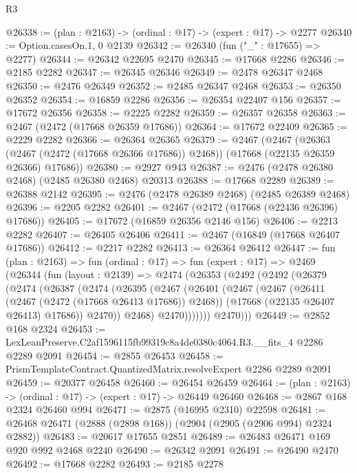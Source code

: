 \begin{lexlean}{R3}
\begin{coremodule}
@26338 := (plan : @2163) -> (ordinal : @17) -> (expert : @17) -> @2277
@26340 := Option.casesOn.{1, 0} @2139
@26342 := @26340 (fun ("_" : @17655) => @2277)
@26344 := @26342 @22695 @2470
@26345 := @17668 @2286
@26346 := @2185 @2282
@26347 := @26345 @26346
@26349 := @2478 @26347 @2468
@26350 := @2476 @26349
@26352 := @2485 @26347 @2468
@26353 := @26350 @26352
@26354 := @16859 @2286
@26356 := @26354 @22407 @156
@26357 := @17672 @26356
@26358 := @2225 @2282
@26359 := @26357 @26358
@26363 := @2467 (@2472 (@17668 @26359 @17686))
@26364 := @17672 @22409
@26365 := @2229 @2282
@26366 := @26364 @26365
@26379 := @2467
    (@2467
      (@26363 (@2467 (@2472 (@17668 @26366 @17686)) @2468))
      (@17668 (@22135 @26359 @26366) @17686))
@26380 := @2927 @943
@26387 := @2476 (@2478 @26380 @2468) (@2485 @26380 @2468) @20313
@26388 := @17668 @2289
@26389 := @26388 @2142
@26395 := @2476 (@2478 @26389 @2468) (@2485 @26389 @2468)
@26396 := @2205 @2282
@26401 := @2467 (@2472 (@17668 (@22436 @26396) @17686))
@26405 := @17672 (@16859 @26356 @2146 @156)
@26406 := @2213 @2282
@26407 := @26405 @26406
@26411 := @2467 (@16849 (@17668 @26407 @17686))
@26412 := @2217 @2282
@26413 := @26364 @26412
@26447 := fun (plan : @2163) =>
  fun (ordinal : @17) =>
  fun (expert : @17) =>
  @2469
    (@26344
      (fun (layout : @2139) =>
      @2474
        (@26353
          (@2492
            (@2492
              (@26379
                (@2474
                  (@26387
                    (@2474
                      (@26395
                        (@2467
                          (@26401
                            (@2467
                              (@2467
                                (@26411 (@2467 (@2472 (@17668 @26413 @17686)) @2468))
                                (@17668 (@22135 @26407 @26413) @17686))
                              @2470))
                          @2468)
                        @2470)))))))
          @2470)))
@26449 := @2852 @168 @2324
@26453 := LexLeanPreserve.C2af1596115fb99319c8a4de0380c4064.R3.__fits_4 @2286 @2289 @2091
@26454 := @2855 @26453
@26458 := PrismTemplateContract.QuantizedMatrix.resolveExpert @2286 @2289 @2091
@26459 := @20377 @26458
@26460 := @26454 @26459
@26464 := (plan : @2163) -> (ordinal : @17) -> (expert : @17) -> @26449 @26460
@26468 := @2867 @168 @2324 @26460 @994
@26471 := @2875 (@16995 @2310) @22598
@26481 := @26468 @26471 (@2888 (@2898 @168)) (@2904 (@2905 (@2906 @994) @2324 @2882))
@26483 := @20617 @17655 @2851
@26489 := @26483 @26471 @169 @920 @992 @2468 @2240
@26490 := @26342 @2091
@26491 := @26490 @2470
@26492 := @17668 @2282
@26493 := @2185 @2278

\end{coremodule}
\end{lexlean}
